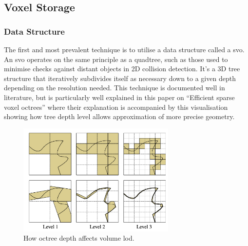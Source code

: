 \documentclass[titlepage]{article}
\begin{document}
\subsection{Voxel Storage}

\subsubsection{Data Structure}
The first and most prevalent technique is to utilise a data structure called a \gls{svo}. An \gls{svo} operates on the same principle as a quadtree, such as those used to minimise checks against distant objects in 2D collision detection. It's a 3D tree structure that iteratively subdivides itself as necessary down to a given depth depending on the resolution needed. This technique is documented well in literature, but is particularly well explained in this paper on ``Efficient sparse voxel octrees'' \cite{octree} where their explanation is accompanied by this visualisation showing how tree depth level allows approximation of more precise geometry.

\begin{figure}[htp]
  \centering
  \includegraphics[width=0.7\textwidth]{octree.png}
  \caption{How octree depth affects volume \gls{lod}.}
\end{figure}
\FloatBarrier
\end{document}
